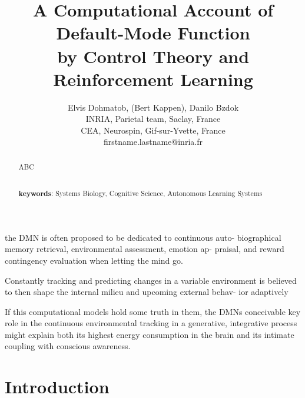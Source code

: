 \documentclass{article} %
\title{A Computational Account of Default-Mode Function\\by Control Theory and Reinforcement Learning}
\begin{document}
\author{Elvis Dohmatob, (Bert Kappen), Danilo Bzdok\\
  INRIA, Parietal team, Saclay, France\\
  CEA, Neurospin, Gif-sur-Yvette, France\\
  firstname.lastname@inria.fr}

\maketitle

\begin{abstract}
ABC
%


\textbf{\\keywords}: Systems Biology, Cognitive Science, Autonomous Learning Systems

\end{abstract}

the DMN is often proposed to be dedicated to continuous auto- biographical memory retrieval, environmental assessment, emotion ap- praisal, and reward contingency evaluation when letting the mind go.

Constantly tracking and predicting changes in a variable environment is believed to then shape the internal milieu and upcoming external behav- ior adaptively




If this computational models hold some truth in them, the DMNs conceivable key role in the continuous environmental tracking in a generative, integrative process might explain both its highest energy consumption in the brain and its intimate coupling with conscious awareness.




\section{Introduction}
%
\end{document}
